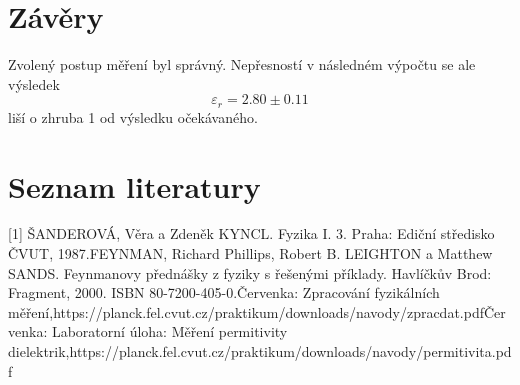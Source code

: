 \documentclass[titlepage]{article}
\begin{document}
  	\section{Závěry}
  		Zvolený postup měření byl správný. Nepřesností v následném výpočtu se ale výsledek $$ \varepsilon_r = 2.80 \pm 0.11 $$ liší o zhruba 1 od výsledku očekávaného.
  	\section{Seznam literatury}
  		[1] ŠANDEROVÁ, Věra a Zdeněk KYNCL. Fyzika I. 3. Praha: Ediční středisko ČVUT, 1987.\newline
		[2] FEYNMAN, Richard Phillips, Robert B. LEIGHTON a Matthew SANDS. Feynmanovy přednášky z fyziky s řešenými příklady. Havlíčkův Brod: Fragment, 2000. ISBN 80-7200-405-0.\newline
		[3] Červenka: Zpracování fyzikálních měření,\newline https://planck.fel.cvut.cz/praktikum/downloads/navody/zpracdat.pdf\newline
		[4] Červenka: Laboratorní úloha: Měření permitivity dielektrik,\newline https://planck.fel.cvut.cz/praktikum/downloads/navody/permitivita.pdf
\end{document}
